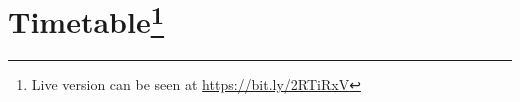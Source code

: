 \documentclass[a4paper,12pt]{article}
\begin{document}
\section*{Timetable\footnote{Live version can be seen at \url{https://bit.ly/2RTiRxV}}}

\begin{figure}[ht]
  \centering
\end{figure}


\end{document}
